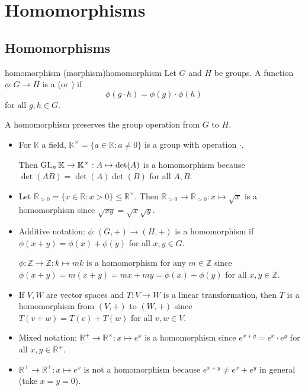 \documentclass[12pt,letterpaper]{report}
\begin{document}
\section{Homomorphisms}

\subsection{Homomorphisms}

\begin{defn}{homomorphism (morphism)}{homomorphism}
  Let $G$ and $H$ be groups.
  A function $\phi \colon G \to H$ is a  (or ) if
  \[ \phi(g \cdot h) = \phi(g) \cdot \phi(h) \]
  for all $g, h \in G$.
\end{defn}

A homomorphism preserves the group operation from $G$ to $H$.

\begin{ex}
  \begin{itemize}
    \item
    For $\mathbb{K}$ a field, $\mathbb{K}^\times = \{a \in \mathbb{K} : a \neq 0\}$ is a group with
    operation $\cdot$.

    Then $\operatorname{GL}_n \mathbb{K} \to \mathbb{K}^\times : A \mapsto \det(A)$ is a homomorphism because
    $\det(AB) = \det(A) \det(B)$ for all $A, B$.
    \item
    Let $\mathbb{R}_{> 0} = \{x \in \mathbb{R} : x > 0\} \leq \mathbb{R}^\times$.
    Then $\mathbb{R}_{> 0} \to \mathbb{R}_{> 0} : x \mapsto \sqrt{x}$ is a homomorphism since
    $\sqrt{xy} = \sqrt{x} \sqrt{y}$.
    \item
    Additive notation: $\phi \colon (G, +) \to (H, +)$ is a homomorphism if
    $\phi(x + y) = \phi(x) + \phi(y)$ for all $x, y \in G$.

    $\phi \colon \mathbb{Z} \to \mathbb{Z} : k \mapsto mk$ is a homomorphism for any
    $m \in \mathbb{Z}$ since $\phi(x + y) = m(x + y) = mx + my = \phi(x) + \phi(y)$ for all
    $x, y \in \mathbb{Z}$.
    \item
    If $V, W$ are vector spaces and $T \colon V \to W$ is a linear transformation, then $T$ is a
    homomorphism from $(V, +)$ to $(W, +)$ since $T(v + w) = T(v) + T(w)$ for all $v, w \in V$.
    \item
    Mixed notation: $\mathbb{R}^+ \to \mathbb{R}^\times : x \mapsto e^x$ is a homomorphism since
    $e^{x + y} = e^x \cdot e^y$ for all $x, y \in \mathbb{R}^+$.
    \item
    $\mathbb{R}^+ \to \mathbb{R}^+ : x \mapsto e^x$ is not a homomorphism because
    $e^{x + y} \neq e^x + e^y$ in general (take $x = y = 0$).
  \end{itemize}
\end{ex}
\end{document}
